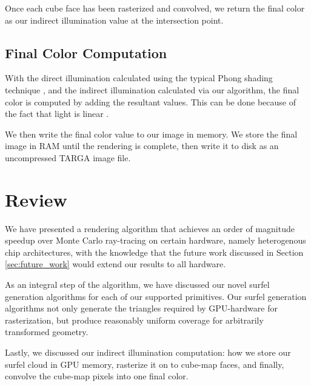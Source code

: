 Once each cube face has been rasterized and convolved, we return the final color as our indirect illumination value at the intersection point.

\subsection{Final Color Computation}

With the direct illumination calculated using the typical Phong shading technique \cite{bib:phong_thesis}, and the indirect illumination calculated via our algorithm, the final color is computed by adding the resultant values. This can be done because of the fact that light is linear \cite{bib:pbr}.

We then write the final color value to our image in memory. We store the final image in RAM until the rendering is complete, then write it to disk as an uncompressed TARGA image file.

\section{Review}
We have presented a rendering algorithm that achieves an order of magnitude speedup over Monte Carlo ray-tracing on certain hardware, namely heterogenous chip architectures, with the knowledge that the future work discussed in Section \ref{sec:future_work} would extend our results to all hardware.

As an integral step of the algorithm, we have discussed our novel surfel generation algorithms for each of our supported primitives. Our surfel generation algorithms not only generate the triangles required by GPU-hardware for rasterization, but produce reasonably uniform coverage for arbitrarily transformed geometry.

Lastly, we discussed our indirect illumination computation: how we store our surfel cloud in GPU memory, rasterize it on to cube-map faces, and finally, convolve the cube-map pixels into one final color.
